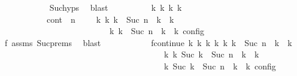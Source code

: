 \begin{isabellebody}
\ \ \ \ \ \ \ \ \ \ \isamarkupfalse%
\ Suc{\isachardot}hyps\ \isamarkupfalse%
\ blast\isanewline
\ \ \ \ \ \ \ \ \isamarkupfalse%
\ {\isasymGamma}\isactrlsub k\ {\isasymPsi}\isactrlsub k\ {\isasymPhi}\isactrlsub k\ k\isanewline
\ \ \ \ \ \ \ \ \ \ \ cont{\isacharcolon}\ {\isacartoucheopen}{\isacharparenleft}{\isacharparenleft}{\isasymGamma}{\isacharcomma}\ n\ {\isasymturnstile}\ {\isasymPsi}\ {\isasymtriangleright}\ {\isasymPhi}{\isacharparenright}\ {\isasymhookrightarrow}\isactrlbsup k\isactrlesup \ {\isacharparenleft}{\isasymGamma}\isactrlsub k{\isacharcomma}\ {\isasymdelta}k\ {\isacharplus}\ Suc\ n\ {\isasymturnstile}\ {\isasymPsi}\isactrlsub k\ {\isasymtriangleright}\ {\isasymPhi}\isactrlsub k{\isacharparenright}{\isacharparenright}\isanewline
\ \ \ \ \ \ \ \ \ \ \ \ \ \ \ \ \ \ \ \ \ \ {\isasymand}\ {\isasymrho}\ {\isasymin}\ {\isasymlbrakk}\ {\isasymGamma}\isactrlsub k{\isacharcomma}\ {\isasymdelta}k\ {\isacharplus}\ Suc\ n\ {\isasymturnstile}\ {\isasymPsi}\isactrlsub k\ {\isasymtriangleright}\ {\isasymPhi}\isactrlsub k\ {\isasymrbrakk}\isactrlsub c\isactrlsub o\isactrlsub n\isactrlsub f\isactrlsub i\isactrlsub g{\isacartoucheclose}\isanewline
\ \ \ \ \ \ \ \ \ \ \isamarkupfalse%
\ f{}\ assms{\isacharparenleft}{}{\isacharparenright}\ Suc{\isachardot}prems\ \isamarkupfalse%
\ blast\isanewline
\ \ \ \ \ \ \ \ \isamarkupfalse%
\ \isamarkupfalse%
\ fcontinue{\isacharcolon}\ {\isacartoucheopen}{\isasymexists}{\isasymGamma}\isactrlsub k{\isacharprime}\ {\isasymPsi}\isactrlsub k{\isacharprime}\ {\isasymPhi}\isactrlsub k{\isacharprime}\ k{\isacharprime}{\isachardot}\ {\isacharparenleft}{\isacharparenleft}{\isasymGamma}\isactrlsub k{\isacharcomma}\ {\isasymdelta}k\ {\isacharplus}\ Suc\ n\ {\isasymturnstile}\ {\isasymPsi}\isactrlsub k\ {\isasymtriangleright}\ {\isasymPhi}\isactrlsub k{\isacharparenright}\isanewline
\ \ \ \ \ \ \ \ \ \ \ \ \ \ \ \ \ \ \ \ \ \ \ \ \ \ \ \ \ \ \ \ \ \ \ \ \ \ \ {\isasymhookrightarrow}\isactrlbsup k{\isacharprime}\isactrlesup \ {\isacharparenleft}{\isasymGamma}\isactrlsub k{\isacharprime}{\isacharcomma}\ Suc\ {\isacharparenleft}{\isasymdelta}k\ {\isacharplus}\ Suc\ n{\isacharparenright}\ {\isasymturnstile}\ {\isasymPsi}\isactrlsub k{\isacharprime}\ {\isasymtriangleright}\ {\isasymPhi}\isactrlsub k{\isacharprime}{\isacharparenright}{\isacharparenright}\isanewline
\ \ \ \ \ \ \ \ \ \ \ \ \ \ \ \ \ \ \ \ \ \ \ \ \ \ \ \ \ \ \ \ \ \ \ {\isasymand}\ {\isasymrho}\ {\isasymin}\ {\isasymlbrakk}\ {\isasymGamma}\isactrlsub k{\isacharprime}{\isacharcomma}\ Suc\ {\isacharparenleft}{\isasymdelta}k\ {\isacharplus}\ Suc\ n{\isacharparenright}\ {\isasymturnstile}\ {\isasymPsi}\isactrlsub k{\isacharprime}\ {\isasymtriangleright}\ {\isasymPhi}\isactrlsub k{\isacharprime}\ {\isasymrbrakk}\isactrlsub c\isactrlsub o\isactrlsub n\isactrlsub f\isactrlsub i\isactrlsub g{\isacartoucheclose}\isanewline

\end{isabellebody}
